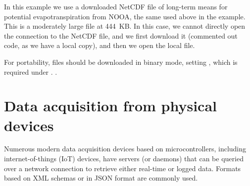 \documentclass[krantz2]{krantz}\usepackage{knitr}
\begin{document}
In this example we use a downloaded NetCDF file of long-term means for potential evapotranspiration from NOOA, the same used above in the  example. This is a moderately large file at 444~KB. In this case, we cannot directly open the connection to the NetCDF file, and we first download it (commented out code, as we have a local copy), and then we open the local file.

\begin{knitrout}\footnotesize
{}\color{fgcolor}\begin{kframe}
\begin{alltt}
 \hlkwb{<-} \hlstd{(}\hlstd{,}
                \hlstd{,}
                 \hlstd{=} \hlstd{)}
 \hlkwb{<-} \hlstd{(}\hlstd{)}
\end{alltt}
\end{kframe}
\end{knitrout}

\begin{warningbox}
For portability,  files should be downloaded in binary mode, setting , which is required under .
.
\end{warningbox}

\section{Data acquisition from physical devices}\label{sec:data:acquisition}

Numerous modern data acquisition devices based on microcontrollers, including internet-of-things (IoT) devices, have servers (or daemons) that can be queried over a network connection to retrieve either real-time or logged data. Formats based on XML schemas or in JSON format are commonly used.

\subsection[jsonlite]{}
\end{document}
